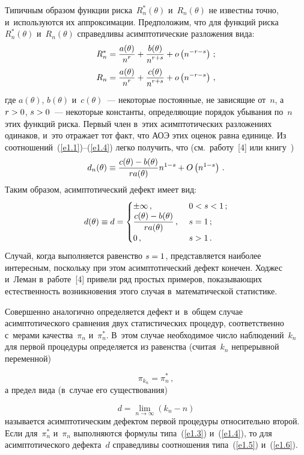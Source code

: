 \begin{multicols}{2}
Типичным образом функции риска~$R^*_n(\theta)$ и~$R_n(\theta)$ не известны точно, 
и~используются их аппроксимации.
Предположим, что для функций риска~$R^*_n(\theta)$ и~$R_n(\theta)$ справедливы 
асимптотические разложения вида:
\begin{align}
R^*_n &= \displaystyle\frac{\displaystyle a(\theta)\mathstrut}{\displaystyle n^r\mathstrut} + \displaystyle\frac{\displaystyle b(\theta)\mathstrut}{\displaystyle n^{r+s}\mathstrut} + 
o\left(n^{-r-s}\right)\,;
\label{e1.3}
\\
R_n & = \displaystyle\frac{\displaystyle a(\theta)\mathstrut}{\displaystyle n^r\mathstrut} + \displaystyle\frac{\displaystyle c(\theta)\mathstrut}{\displaystyle n^{r+s}\mathstrut} + 
o\left(n^{-r-s}\right)\,,
\label{e1.4}
\end{align}
где $a(\theta)$, $b(\theta)$ и~$c(\theta)$~--- некоторые постоянные, не зависящие 
от~$n$, а~$r\hm > 0$, $s\hm > 0$~--- некоторые константы, определяющие 
порядок убывания по~$n$ этих функций риска. Первый член в~этих асимптотических 
разложениях одинаков, и~это отражает тот факт, что АОЭ этих оценок равна единице. 
Из соотношений~(\ref{e1.1})--(\ref{e1.4}) легко получить, что (см.\
работу~[4] или книгу~\cite[с.~310]{4-ben})
\begin{equation}
d_n(\theta) \equiv \displaystyle\frac{\displaystyle c(\theta) - b(\theta)\mathstrut}{\displaystyle r a(\theta)\mathstrut} n^{1-s} +
O\left(n^{1-s}\right)\,.
\label{e1.5}
\end{equation}
Таким образом, асимптотический дефект имеет вид:
\begin{equation}
d(\theta) \equiv d = 
\begin{cases}
\pm\infty\,,  &\  0 < s < 1\,;\\
\displaystyle\frac{\displaystyle c(\theta) - b(\theta)\mathstrut}{\displaystyle r a(\theta)\mathstrut}\,,&\  s = 1\,;\\
0\,,&\  s > 1\,.
\end{cases}
\label{e1.6}
\end{equation}
Случай, когда выполняется равенство $s\hm = 1$, представляется наиболее интересным, 
поскольку при этом асимптотический дефект конечен.
Ходжес и~Леман в~работе~[4] привели ряд простых примеров, показывающих естественность 
возникновения этого случая в~математической статистике.

Совершенно аналогично определяется дефект и~в~общем случае асимптотического 
сравнения двух статистических процедур, соответственно с~мерами качества~$\pi_{n}$ 
и~$\pi_{n}^*$. В~этом случае необходимое число наблюдений~$k_n$ для первой 
процедуры определяется из равенства (считая~$k_n$ непрерывной переменной)

\noindent
$$
\pi_{k_n} = \pi_n^*\,,
$$
а предел вида (в~случае его существования)

\noindent
$$
d = \lim\limits_{n\to\infty} \left(k_n - n\right)
$$
называется асимптотическим дефектом первой процедуры относительно второй. 
Если для~$\pi_{n}^*$ и~$\pi_{n}$ выполняются формулы типа~(\ref{e1.3}) 
и~(\ref{e1.4}), то для асимптотического дефекта~$d$ справедливы соотношения 
типа~(\ref{e1.5}) и~(\ref{e1.6}).


\end{multicols}
